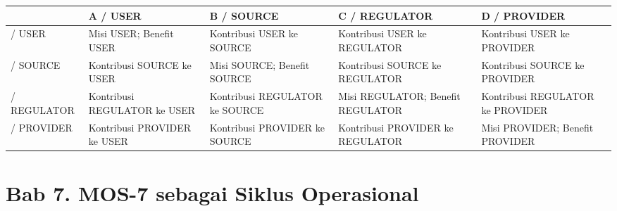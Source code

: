 \documentclass[
  letterpaper,
  DIV=11,
  numbers=noendperiod]{scrreprt}
\newcounter{none} %
\begin{document}
{\def\LTcaptype{none} %
\begin{longtable}[]{@{}
  >{\raggedright\arraybackslash}p{}
  >{\raggedright\arraybackslash}p{}
  >{\raggedright\arraybackslash}p{}
  >{\raggedright\arraybackslash}p{}
  >{\raggedright\arraybackslash}p{}@{}}
\toprule\noalign{}
\begin{minipage}[b]{\linewidth}\raggedright
\end{minipage} & \begin{minipage}[b]{\linewidth}\raggedright
A / USER
\end{minipage} & \begin{minipage}[b]{\linewidth}\raggedright
B / SOURCE
\end{minipage} & \begin{minipage}[b]{\linewidth}\raggedright
C / REGULATOR
\end{minipage} & \begin{minipage}[b]{\linewidth}\raggedright
D / PROVIDER
\end{minipage} \\
\midrule\noalign{}
\endhead
\bottomrule\noalign{}
\endlastfoot
1 / USER & Misi USER; Benefit USER & Kontribusi USER ke SOURCE &
Kontribusi USER ke REGULATOR & Kontribusi USER ke PROVIDER \\
2 / SOURCE & Kontribusi SOURCE ke USER & Misi SOURCE; Benefit SOURCE &
Kontribusi SOURCE ke REGULATOR & Kontribusi SOURCE ke PROVIDER \\
3 / REGULATOR & Kontribusi REGULATOR ke USER & Kontribusi REGULATOR ke
SOURCE & Misi REGULATOR; Benefit REGULATOR & Kontribusi REGULATOR ke
PROVIDER \\
4 / PROVIDER & Kontribusi PROVIDER ke USER & Kontribusi PROVIDER ke
SOURCE & Kontribusi PROVIDER ke REGULATOR & Misi PROVIDER; Benefit
PROVIDER \\
\end{longtable}
}


\chapter*{Bab 7. MOS-7 sebagai Siklus
Operasional}\label{bab-7.-mos-7-sebagai-siklus-operasional}
\end{document}
